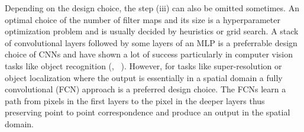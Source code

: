 Depending on the design choice, the step (iii) can also be omitted sometimes. An optimal choice of the number of filter maps and its size is a hyperparameter optimization problem and is usually decided by heuristics or grid search. A stack of convolutional layers followed by some layers of an MLP is a preferrable design choice of CNNs and have shown a lot of success particularly in computer vision tasks like object recognition (\cite{krizhevsky2012imagenet}, ~\cite{donahue2014decaf}). However, for tasks like super-resolution or object localization where the output is essentially in a spatial domain a fully convolutional (FCN) approach is a preferred design choice. The FCNs learn a path from pixels in the first layers to the pixel in the deeper layers thus preserving point to point correspondence and produce an output in the spatial domain. 







